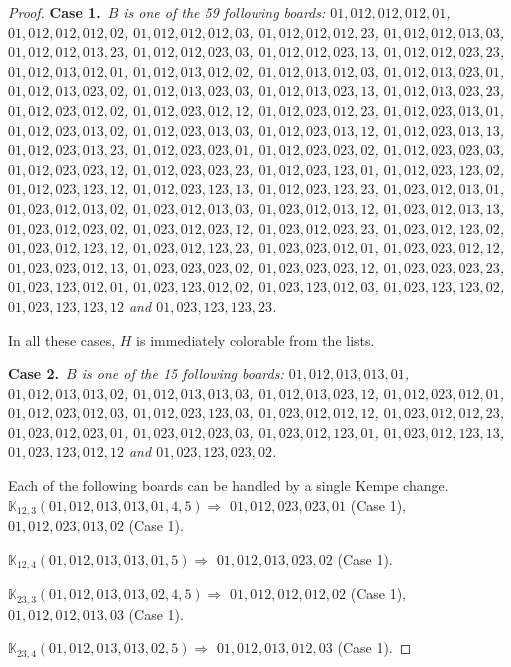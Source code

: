 \documentclass[12pt]{article}
\newcommand{\K}{\mathbb{K}}
\newcommand{\case}[2]{{\bf Case #1.}~{\it #2}~~}
\begin{document}
\begin{proof}
\bigskip
\case{1}{$B$ is one of the 59 following boards:
 $01,012,012,012,01$, $01,012,012,012,02$, $01,012,012,012,03$, $01,012,012,012,23$, $01,012,012,013,03$, $01,012,012,013,23$, $01,012,012,023,03$, $01,012,012,023,13$, $01,012,012,023,23$, $01,012,013,012,01$, $01,012,013,012,02$, $01,012,013,012,03$, $01,012,013,023,01$, $01,012,013,023,02$, $01,012,013,023,03$, $01,012,013,023,13$, $01,012,013,023,23$, $01,012,023,012,02$, $01,012,023,012,12$, $01,012,023,012,23$, $01,012,023,013,01$, $01,012,023,013,02$, $01,012,023,013,03$, $01,012,023,013,12$, $01,012,023,013,13$, $01,012,023,013,23$, $01,012,023,023,01$, $01,012,023,023,02$, $01,012,023,023,03$, $01,012,023,023,12$, $01,012,023,023,23$, $01,012,023,123,01$, $01,012,023,123,02$, $01,012,023,123,12$, $01,012,023,123,13$, $01,012,023,123,23$, $01,023,012,013,01$, $01,023,012,013,02$, $01,023,012,013,03$, $01,023,012,013,12$, $01,023,012,013,13$, $01,023,012,023,02$, $01,023,012,023,12$, $01,023,012,023,23$, $01,023,012,123,02$, $01,023,012,123,12$, $01,023,012,123,23$, $01,023,023,012,01$, $01,023,023,012,12$, $01,023,023,012,13$, $01,023,023,023,02$, $01,023,023,023,12$, $01,023,023,023,23$, $01,023,123,012,01$, $01,023,123,012,02$, $01,023,123,012,03$, $01,023,123,123,02$, $01,023,123,123,12$ and $01,023,123,123,23$.}

\bigskip

In all these cases, $H$ is immediately colorable from the lists.

\bigskip
\case{2}{$B$ is one of the 15 following boards:
 $01,012,013,013,01$, $01,012,013,013,02$, $01,012,013,013,03$, $01,012,013,023,12$, $01,012,023,012,01$, $01,012,023,012,03$, $01,012,023,123,03$, $01,023,012,012,12$, $01,023,012,012,23$, $01,023,012,023,01$, $01,023,012,023,03$, $01,023,012,123,01$, $01,023,012,123,13$, $01,023,123,012,12$ and $01,023,123,023,02$.}

\bigskip

\bigskip

Each of the following boards can be handled by a single Kempe change.
$\K_{12,3}(01,012,013,013,01,4, 5)\Rightarrow $ $01,012,023,023,01$ (Case 1), $01,012,023,013,02$ (Case 1).

$\K_{12,4}(01,012,013,013,01,5)\Rightarrow $ $01,012,013,023,02$ (Case 1).


\bigskip

$\K_{23,3}(01,012,013,013,02,4, 5)\Rightarrow $ $01,012,012,012,02$ (Case 1), $01,012,012,013,03$ (Case 1).

$\K_{23,4}(01,012,013,013,02,5)\Rightarrow $ $01,012,013,012,03$ (Case 1).



\end{proof}
\end{document}
